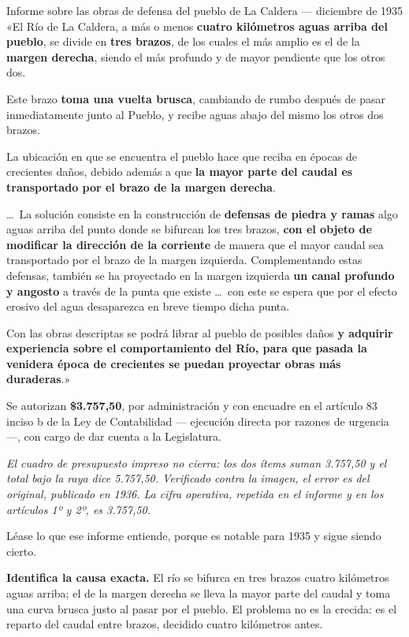 \begin{ficha}{Informe sobre las obras de defensa del pueblo de La Caldera --- diciembre de 1935}
«El Río de La Caldera, a más o menos \textbf{cuatro kilómetros aguas arriba del pueblo}, se
divide en \textbf{tres brazos}, de los cuales el más amplio es el de la \textbf{margen
derecha}, siendo el más profundo y de mayor pendiente que los otros dos.

Este brazo \textbf{toma una vuelta brusca}, cambiando de rumbo después de pasar
inmediatamente junto al Pueblo, y recibe aguas abajo del mismo los otros dos brazos.

La ubicación en que se encuentra el pueblo hace que reciba en épocas de crecientes daños,
debido además a que \textbf{la mayor parte del caudal es transportado por el brazo de la
margen derecha}.

\ldots\ La solución consiste en la construcción de \textbf{defensas de piedra y ramas} algo
aguas arriba del punto donde se bifurcan los tres brazos, \textbf{con el objeto de modificar
la dirección de la corriente} de manera que el mayor caudal sea transportado por el brazo de
la margen izquierda. Complementando estas defensas, también se ha proyectado en la margen
izquierda \textbf{un canal profundo y angosto} a través de la punta que existe \ldots\ con
este se espera que por el efecto erosivo del agua desaparezca en breve tiempo dicha punta.

Con las obras descriptas se podrá librar al pueblo de posibles daños \textbf{y adquirir
experiencia sobre el comportamiento del Río, para que pasada la venidera época de crecientes
se puedan proyectar obras más duraderas}.»

Se autorizan \textbf{\$3.757,50}, por administración y con encuadre en el artículo 83 inciso
b de la Ley de Contabilidad --- ejecución directa por razones de urgencia ---, con cargo de
dar cuenta a la Legislatura.

\textit{El cuadro de presupuesto impreso no cierra: los dos ítems suman 3.757,50 y el total
bajo la raya dice 5.757,50. Verificado contra la imagen, el error es del original, publicado en 1936. La
cifra operativa, repetida en el informe y en los artículos 1º y 2º, es 3.757,50.}
\end{ficha}

Léase lo que ese informe entiende, porque es notable para 1935 y sigue siendo cierto.

\textbf{Identifica la causa exacta.} El río se bifurca en tres brazos cuatro kilómetros
aguas arriba; el de la margen derecha se lleva la mayor parte del caudal y toma una curva
brusca justo al pasar por el pueblo. El problema no es la crecida: es el reparto del caudal
entre brazos, decidido cuatro kilómetros antes.

